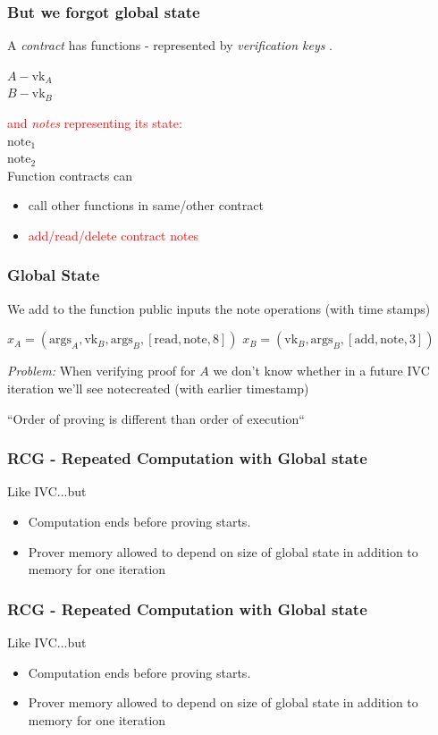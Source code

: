 \documentclass[shadesubsections,compress,14pt,mathserif]{beamer}
\newcommand{\nl}{\\ \pause \vspace{0.2in}}
\newcommand{\nlnp}{\\ \vspace{0.2in}}
\newcommand{\vk}{\ensuremath{\mathrm{vk} }}
\newcommand{\add}{\ensuremath{\mathrm{add} }}
\renewcommand{\read}{\ensuremath{\mathrm{read} }}
\renewcommand{\note}{\ensuremath{\mathrm{note} }}
\newcommand{\args}{\ensuremath{\mathrm{args} }}
\begin{document}
\begin{frame}
 \frametitle{ But we forgot global state }
A \emph{contract} has functions - represented by \emph{verification keys} .\nlnp

$A - \vk_A$\\
$B - \vk_B$\nl

{\textcolor{red}{and \emph{notes} representing its state:}}\\
$\note_1$\\
$\note_2$\nl
Function contracts can 
\begin{itemize}
 \item call other functions in same/other contract
 \item \textcolor{red}{add/read/delete contract notes}
 \end{itemize}
 \end{frame}
\begin{frame}
 \frametitle{Global State}
 We add to the function public inputs the  note operations (with time stamps)
 
 $x_A=(\args_A,\vk_B,\args_B,[\read,\note,8])$
 $x_B=(\vk_B,\args_B,[\add,\note,3])$
 
 \emph{Problem:} When verifying proof for $A$ we don't know whether in a future IVC iteration we'll see \note created (with earlier timestamp)\pause
 
 
 ``Order of proving is different than order of execution``
\end{frame}
\begin{frame}
 \frametitle{RCG - Repeated Computation with Global state}
 Like IVC...but
 \begin{itemize}
  \item Computation ends before proving starts.
  \item Prover memory allowed to depend on size of global state in addition to memory for one iteration
 \end{itemize}

\end{frame}
\begin{frame}
 \frametitle{RCG - Repeated Computation with Global state}
 Like IVC...but
 \begin{itemize}
  \item Computation ends before proving starts.
  \item Prover memory allowed to depend on size of global state in addition to memory for one iteration
 \end{itemize}
\end{frame}
\end{document}
